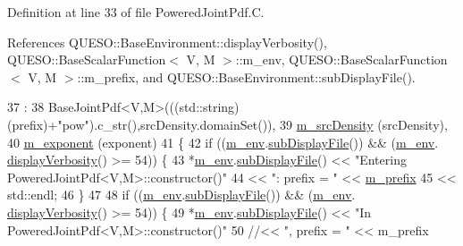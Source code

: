 Definition at line 33 of file Powered\-Joint\-Pdf.\-C.



References Q\-U\-E\-S\-O\-::\-Base\-Environment\-::display\-Verbosity(), Q\-U\-E\-S\-O\-::\-Base\-Scalar\-Function$<$ V, M $>$\-::m\-\_\-env, Q\-U\-E\-S\-O\-::\-Base\-Scalar\-Function$<$ V, M $>$\-::m\-\_\-prefix, and Q\-U\-E\-S\-O\-::\-Base\-Environment\-::sub\-Display\-File().


\begin{DoxyCode}
37   :
38   BaseJointPdf<V,M>(((std::string)(prefix)+\textcolor{stringliteral}{"pow"}).c\_str(),srcDensity.domainSet()),
39   \hyperlink{class_q_u_e_s_o_1_1_powered_joint_pdf_a80cd4ecb6f5dc0e1f61d0317ef07a616}{m\_srcDensity}            (srcDensity),
40   \hyperlink{class_q_u_e_s_o_1_1_powered_joint_pdf_a867f4a159b1bf2419ef049507306ce79}{m\_exponent}              (exponent)
41 \{
42   \textcolor{keywordflow}{if} ((\hyperlink{class_q_u_e_s_o_1_1_base_scalar_function_adf44141aeb765d97613286f88f235f04}{m\_env}.\hyperlink{class_q_u_e_s_o_1_1_base_environment_a8a0064746ae8dddfece4229b9ad374d6}{subDisplayFile}()) && (\hyperlink{class_q_u_e_s_o_1_1_base_scalar_function_adf44141aeb765d97613286f88f235f04}{m\_env}.
      \hyperlink{class_q_u_e_s_o_1_1_base_environment_a1fe5f244fc0316a0ab3e37463f108b96}{displayVerbosity}() >= 54)) \{
43     *\hyperlink{class_q_u_e_s_o_1_1_base_scalar_function_adf44141aeb765d97613286f88f235f04}{m\_env}.\hyperlink{class_q_u_e_s_o_1_1_base_environment_a8a0064746ae8dddfece4229b9ad374d6}{subDisplayFile}() << \textcolor{stringliteral}{"Entering PoweredJointPdf<V,M>::constructor()"}
44                             << \textcolor{stringliteral}{": prefix = "} << \hyperlink{class_q_u_e_s_o_1_1_base_scalar_function_a6e81dc902aca6a546877da99b2f4a169}{m\_prefix}
45                             << std::endl;
46   \}
47 
48   \textcolor{keywordflow}{if} ((\hyperlink{class_q_u_e_s_o_1_1_base_scalar_function_adf44141aeb765d97613286f88f235f04}{m\_env}.\hyperlink{class_q_u_e_s_o_1_1_base_environment_a8a0064746ae8dddfece4229b9ad374d6}{subDisplayFile}()) && (\hyperlink{class_q_u_e_s_o_1_1_base_scalar_function_adf44141aeb765d97613286f88f235f04}{m\_env}.
      \hyperlink{class_q_u_e_s_o_1_1_base_environment_a1fe5f244fc0316a0ab3e37463f108b96}{displayVerbosity}() >= 54)) \{
49     *\hyperlink{class_q_u_e_s_o_1_1_base_scalar_function_adf44141aeb765d97613286f88f235f04}{m\_env}.\hyperlink{class_q_u_e_s_o_1_1_base_environment_a8a0064746ae8dddfece4229b9ad374d6}{subDisplayFile}() << \textcolor{stringliteral}{"In PoweredJointPdf<V,M>::constructor()"}
50                           \textcolor{comment}{//<< ", prefix = "     << m\_prefix}

\end{DoxyCode}
